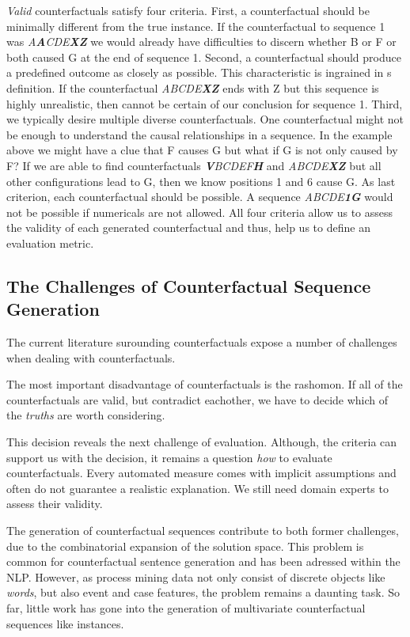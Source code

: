 \documentclass[12pt,a4paper]{report}
\begin{document}
\emph{Valid} counterfactuals satisfy four criteria. First, a counterfactual should be minimally different from the true instance. If the counterfactual to sequence 1 was \textit{A\textbf{A}CDE\textbf{XZ}} we would already have difficulties to discern whether B or F or both caused G at the end of sequence 1. Second, a counterfactual should produce a predefined outcome as closely as possible. This characteristic is ingrained in \citeauthor{molnar2019}s definition. If the counterfactual \textit{ABCDE\textbf{XZ}} ends with Z but this sequence is highly unrealistic, then cannot be certain of our conclusion for sequence 1. Third, we typically desire multiple diverse counterfactuals.  One counterfactual might not be enough to understand the causal relationships in a sequence. In the example above we might have a clue that F causes G but what if G is not only caused by F? If we are able to find counterfactuals \textit{\textbf{V}BCDEF\textbf{H}} and \textit{ABCDE\textbf{XZ}} but all other configurations lead to G, then we know positions 1 and 6 cause G. As last criterion, each counterfactual should be possible. A sequence \textit{ABCDE\textbf{1G}} would not be possible if numericals are not allowed. All four criteria allow us to assess the validity of each generated counterfactual and thus, help us to define an evaluation metric. 

\subsection{The Challenges of Counterfactual Sequence Generation}
The current literature surounding counterfactuals expose a number of challenges when dealing with counterfactuals. 

The most important disadvantage of counterfactuals is the \gls{rashomon}\autocite[ch. 9.3]{molnar2019}. If all of the counterfactuals are valid, but contradict eachother, we have to decide which of the \emph{truths} are worth considering. 

This decision reveals the next challenge of evaluation\needscite. Although, the criteria can support us with the decision, it remains a question \emph{how} to evaluate counterfactuals. Every automated measure comes with implicit assumptions and often do not guarantee a realistic explanation. We still need domain experts to assess their validity. 

The generation of counterfactual sequences contribute to both former challenges, due to the combinatorial expansion of the solution space. This problem is common for counterfactual sentence generation and has been adressed within the \gls{NLP}\needscite. However, as process mining data not only consist of discrete objects like \emph{words}, but also event and case features, the problem remains a daunting task. So far, little work has gone into the generation of multivariate counterfactual sequences like \glspl{instance}\needscite.
\end{document}
